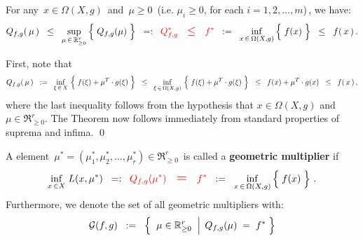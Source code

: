 \vskip 1.0cm
\begin{theorem}\label{WeakDuality}
\mbox{}
\vskip 0.1cm
\noindent
For any \,$x \in \Omega(X,g)$\, and \,$\mu \geq 0$\, (i.e. $\mu_{i} \geq 0$, for each $i =1,2,\ldots,m$)\,,
we have:
\begin{equation*}
Q_{f,g}\!\left(\,\mu\,\right)
\;\; \leq \;\;
	\underset{\mu\,\in\,\Re_{\geq 0}^{r}}{\sup}\left\{\;
		\overset{{\color{white}.}}{Q_{f,g}(\mu)}
		\;\right\}
\;\; =: \;\;
	{\color{red}Q_{f,g}^{*}}
\quad\textnormal{\large{\color{red}$\leq$}}\quad
	{\color{red}f^{*}}
\;\; := \;\;
	\underset{x\,\in\,\Omega(X,g)}{\inf}\left\{\;
		\overset{{\color{white}.}}{f(x)}
		\;\right\}
\;\; \leq \;\;
	f(\,x\,)\,.
\end{equation*}
\end{theorem}
\proof
First, note that
\begin{equation*}
Q_{f,g}\!\left(\,\mu\,\right)
\;\; := \;\;
	\underset{\xi\,\in\,X}{\inf}\,\left\{\;f(\xi) \overset{{\color{white}.}}{+} \mu^{T}\cdot g(\xi)\;\right\}
\;\; \leq \;\;
	\underset{\xi\,\in\,\Omega(X,g)}{\inf}\,\left\{\;f(\xi) \overset{{\color{white}.}}{+} \mu^{T}\cdot g(\xi)\;\right\}
\;\; \leq \;\;
	f(x) \overset{{\color{white}.}}{+} \mu^{T}\cdot g(x)
\;\; \leq \;\;
	f(\,x\,)\,,
\end{equation*}
where the last inequality follows from the hypothesis that $x \in \Omega(X,g)$ and $\mu \in \Re_{\geq 0}^{r}$.
The Theorem now follows immediately from standard properties of suprema and infima.
\qed

\vskip 1.0cm
\begin{definition}
\mbox{}
\vskip 0.1cm
\noindent
A element
\,$\mu^{*} = (\mu_{1}^{*},\mu_{2}^{*},\ldots,\mu_{r}^{*}) \in \Re_{\geq 0}^{r}$\,
is called a \textbf{geometric multiplier} if
\begin{equation*}
	\underset{x\,\in X}{\inf}\;L(x,\mu^{*})
\;\; =: \;\;
	{\color{red}Q_{f,g}(\mu^{*})}
\quad\textnormal{\Large{\color{red}$=$}}\quad
	{\color{red}f^{*}}
\;\; := \;\;
	\underset{x\,\in\,\Omega(X,g)}{\inf}\left\{\;
		\overset{{\color{white}.}}{f(x)}
		\;\right\}\,.
\end{equation*}
Furthermore, we denote the set of all geometric multipliers with:
\begin{equation*}
\mathcal{G}(f,g)
\;\; := \;\;
	\left\{\;\,
		\left.
		\overset{{\color{white}1}}{\mu} \in \Re_{\geq 0}^{r}
		\;\;\right\vert\;
			Q_{f,g}(\mu) \; = \; f^{*}
		\;\right\}
\end{equation*}
\end{definition}

